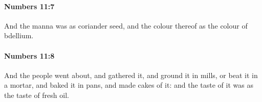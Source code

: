 		\paragraph{Numbers 11:7} %
			\label{NUMBERS-11-7}

			And the manna was as coriander seed, and the colour thereof as the colour of bdellium.


		\paragraph{Numbers 11:8} %
			\label{NUMBERS-11-8}

			And the people went about, and gathered it, and ground it in mills, or beat it in a mortar, and baked it in pans, and made cakes of it: and the taste of it was as the taste of fresh oil.


